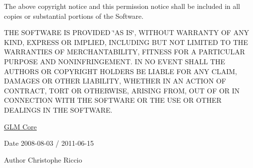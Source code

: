 The above copyright notice and this permission notice shall be included in all copies or substantial portions of the Software.

T\-H\-E S\-O\-F\-T\-W\-A\-R\-E I\-S P\-R\-O\-V\-I\-D\-E\-D \char`\"{}\-A\-S I\-S\char`\"{}, W\-I\-T\-H\-O\-U\-T W\-A\-R\-R\-A\-N\-T\-Y O\-F A\-N\-Y K\-I\-N\-D, E\-X\-P\-R\-E\-S\-S O\-R I\-M\-P\-L\-I\-E\-D, I\-N\-C\-L\-U\-D\-I\-N\-G B\-U\-T N\-O\-T L\-I\-M\-I\-T\-E\-D T\-O T\-H\-E W\-A\-R\-R\-A\-N\-T\-I\-E\-S O\-F M\-E\-R\-C\-H\-A\-N\-T\-A\-B\-I\-L\-I\-T\-Y, F\-I\-T\-N\-E\-S\-S F\-O\-R A P\-A\-R\-T\-I\-C\-U\-L\-A\-R P\-U\-R\-P\-O\-S\-E A\-N\-D N\-O\-N\-I\-N\-F\-R\-I\-N\-G\-E\-M\-E\-N\-T. I\-N N\-O E\-V\-E\-N\-T S\-H\-A\-L\-L T\-H\-E A\-U\-T\-H\-O\-R\-S O\-R C\-O\-P\-Y\-R\-I\-G\-H\-T H\-O\-L\-D\-E\-R\-S B\-E L\-I\-A\-B\-L\-E F\-O\-R A\-N\-Y C\-L\-A\-I\-M, D\-A\-M\-A\-G\-E\-S O\-R O\-T\-H\-E\-R L\-I\-A\-B\-I\-L\-I\-T\-Y, W\-H\-E\-T\-H\-E\-R I\-N A\-N A\-C\-T\-I\-O\-N O\-F C\-O\-N\-T\-R\-A\-C\-T, T\-O\-R\-T O\-R O\-T\-H\-E\-R\-W\-I\-S\-E, A\-R\-I\-S\-I\-N\-G F\-R\-O\-M, O\-U\-T O\-F O\-R I\-N C\-O\-N\-N\-E\-C\-T\-I\-O\-N W\-I\-T\-H T\-H\-E S\-O\-F\-T\-W\-A\-R\-E O\-R T\-H\-E U\-S\-E O\-R O\-T\-H\-E\-R D\-E\-A\-L\-I\-N\-G\-S I\-N T\-H\-E S\-O\-F\-T\-W\-A\-R\-E.

\hyperlink{group__core}{G\-L\-M Core}

\begin{DoxyDate}{Date}
2008-\/08-\/03 / 2011-\/06-\/15 
\end{DoxyDate}
\begin{DoxyAuthor}{Author}
Christophe Riccio 
\end{DoxyAuthor}
